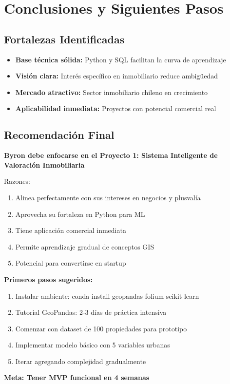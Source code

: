 \documentclass[12pt,a4paper]{article}
\begin{document}
\section{Conclusiones y Siguientes Pasos}

\subsection{Fortalezas Identificadas}

\begin{itemize}
    \item \textbf{Base técnica sólida:} Python y SQL facilitan la curva de aprendizaje
    \item \textbf{Visión clara:} Interés específico en inmobiliario reduce ambigüedad
    \item \textbf{Mercado atractivo:} Sector inmobiliario chileno en crecimiento
    \item \textbf{Aplicabilidad inmediata:} Proyectos con potencial comercial real
\end{itemize}

\subsection{Recomendación Final}

\begin{tcolorbox}[colback=goldstar!10!white,colframe=goldstar!75!black,title=\textbf{RECOMENDACIÓN DEL PROFESOR}]
\textbf{Byron debe enfocarse en el Proyecto 1: Sistema Inteligente de Valoración Inmobiliaria}

Razones:
\begin{enumerate}
    \item Alinea perfectamente con sus intereses en negocios y plusvalía
    \item Aprovecha su fortaleza en Python para ML
    \item Tiene aplicación comercial inmediata
    \item Permite aprendizaje gradual de conceptos GIS
    \item Potencial para convertirse en startup
\end{enumerate}

\textbf{Primeros pasos sugeridos:}
\begin{enumerate}
    \item Instalar ambiente: conda install geopandas folium scikit-learn
    \item Tutorial GeoPandas: 2-3 días de práctica intensiva
    \item Comenzar con dataset de 100 propiedades para prototipo
    \item Implementar modelo básico con 5 variables urbanas
    \item Iterar agregando complejidad gradualmente
\end{enumerate}

\textbf{Meta: Tener MVP funcional en 4 semanas}
\end{tcolorbox}
\end{document}
